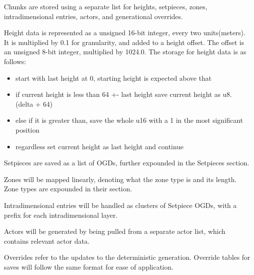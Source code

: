 Chunks are stored using a separate list for heights, setpieces, zones, intradimensional entries, actors, and generational overrides.

Height data is represented as a unsigned 16-bit integer, every two units(meters). It is multiplied by 0.1 for granularity, and added to a height offset. The offset is an unsigned 8-bit integer, multiplied by 1024.0. The storage for height data is as follows:

\begin{itemize}
    \item start with last height at 0, starting height is expected above that
    \item if current height is less than 64 +- last height save current height as u8. (delta + 64)
    \item else if it is greater than, save the whole u16 with a 1 in the most significant position
    \item regardless set current height as last height and continue
\end{itemize}

Setpieces are saved as a list of OGDs, further expounded in the Setpieces section.

Zones will be mapped linearly, denoting what the zone type is and its length. Zone types are expounded in their section.

Intradimensional entries will be handled as clusters of Setpiece OGDs, with a prefix for each intradimensional layer.

Actors will be generated by being pulled from a separate actor list, which contains relevant actor data.

Overrides refer to the updates to the deterministic generation. Override tables for saves will follow the same format for ease of application.